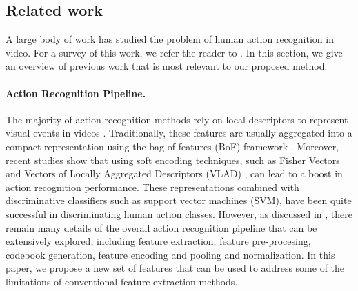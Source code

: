 \documentclass[runningheads]{llncs}
\begin{document}
\subsection*{Related work}\label{subsec: related work}
A large body of work has studied the problem of human action recognition in video. For a survey of this work, we refer the reader to \cite{aggarwal2011}. In this section, we give an overview of previous work that is most relevant to our proposed method.

\paragraph{\textbf{Action Recognition Pipeline.}} The majority of action recognition methods rely on local descriptors to represent visual events in videos \cite{laptev2005,dollar2005,wang2011}. Traditionally, these features are usually aggregated into a compact representation using the bag-of-features (BoF) framework \cite{laptev2008, escorcia2013}. Moreover, recent studies show that using soft encoding techniques, such as  Fisher Vectors \cite{perronnin2010} and Vectors of Locally Aggregated Descriptors (VLAD) \cite{jegou2012}, can lead to a boost in action recognition performance. These representations combined with discriminative classifiers such as support vector machines (SVM), have been quite successful in discriminating human action classes. However, as discussed in \cite{xwang2013}, there remain many details of the overall action recognition pipeline that can be extensively explored, including feature extraction, feature pre-procesing, codebook generation, feature encoding and pooling and normalization. In this paper, we propose a new set of features that can be used to address some of the limitations of conventional feature extraction methods.
\end{document}
